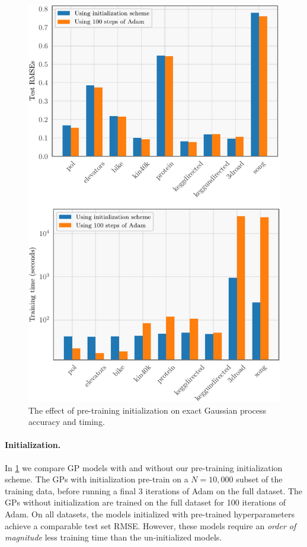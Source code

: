 \begin{figure}[t!]
  \centering
  \includegraphics[width=0.75\linewidth]{figures/initialization.pdf}
  \caption[
    The effect of pre-training initialization on exact Gaussian process accuracy and timing.
  ]{
    The effect of pre-training initialization on exact Gaussian process accuracy and timing.
  }
  \label{fig:initialization}
\end{figure}

\paragraph{Initialization.}
In \cref{fig:initialization} we compare GP models with and without our pre-training initialization scheme.
The GPs with initialization pre-train on a $N=10,\!000$ subset of the training data, before running a final $3$ iterations of Adam on the full dataset.
The GPs without initialization are trained on the full dataset for 100 iterations of Adam.
On all datasets, the models initialized with pre-trained hyperparameters achieve a comparable test set RMSE.
However, these models require an \emph{order of magnitude} less training time than the un-initialized models.
